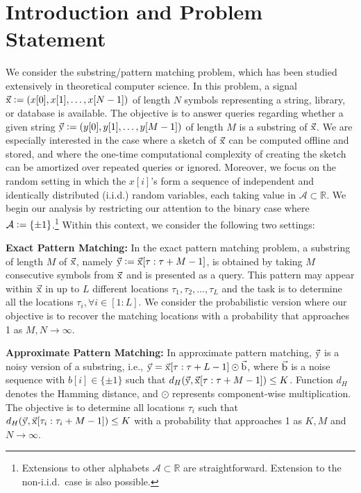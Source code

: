\section{Introduction and Problem Statement}
\label{sec:introduction}
We consider the substring/pattern matching problem, which has been studied extensively in theoretical computer science.
In this problem, a signal $\vec{\mathrm{x}} \mathrel{\mathop:}= (x[0], x[1], \ldots, x[N-1])$ of length $N$ symbols representing a string, library, or database is available.
The objective is to answer queries regarding whether a given string $\vec{\mathrm{y}} \mathrel{\mathop:}= (y[0], y[1],\ldots, y[M-1])$ of length $M$ is a substring of $\vec{\mathrm{x}}$.
We are especially interested in the case where a sketch of $\vec{\mathrm{x}}$ can be computed offline and stored, and where the one-time computational complexity of creating the sketch can be amortized over repeated queries or ignored.
Moreover, we focus on the random setting in which the $x[i]$'s form a sequence of independent and identically distributed (i.i.d.) random variables, each taking value in $\mathcal{A} \subset \mathbb{R}$. We begin our analysis by restricting our attention to the binary case where $\mathcal{A} \mathrel{\mathop:}= \{\pm 1\}$.\footnote{Extensions to other alphabets $\mathcal{A} \subset \mathbb{R}$ are straightforward. Extension to the non-i.i.d.\ case is also possible.}
Within this context, we consider the following two settings:

{\bf Exact Pattern Matching:} In the exact pattern matching problem, a substring of length $M$ of $\vec{\mathrm{x}}$, namely $\vec{\mathrm{y}} \mathrel{\mathop:}= \vec{\mathrm{x}}[\tau:\tau+M-1]$, is obtained by taking $M$ consecutive symbols from $\vec{\mathrm{x}}$ and is presented as a query. This pattern may appear within $\vec{\mathrm{x}}$ in up to $L$ different locations $\tau_1, \tau_2, \ldots, \tau_L$ and the task is to determine all the locations $\tau_i, \forall i\in[1:L]$.
We consider the probabilistic version where our objective is to recover the matching locations with a probability that approaches 1 as $M,N \rightarrow \infty$.

{\bf Approximate Pattern Matching:} In approximate pattern matching, $\vec{\mathrm{y}}$ is a noisy version of a substring, i.e., $\vec{\mathrm{y}} = \vec{\mathrm{x}}[\tau:\tau+L-1] \odot \vec{\mathrm{b}}$, where $\vec{\mathrm{b}}$ is a noise sequence with $b[i] \in \{ \pm 1 \}$ such that $d_H(\vec{\mathrm{y}},\vec{\mathrm{x}}[\tau:\tau+M-1]) \leq K$.
Function $d_H$ denotes the Hamming distance, and $\odot$ represents component-wise multiplication. The objective is to determine all locations $\tau_i$ such that $d_H(\vec{\mathrm{y}},\vec{\mathrm{x}}[\tau_i:\tau_i+M-1]) \leq K$ with a probability that approaches 1 as $K, M$ and $N \rightarrow \infty$.

